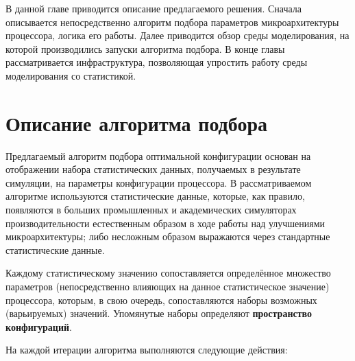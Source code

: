 В данной главе приводится описание предлагаемого решения. Сначала описывается непосредственно алгоритм подбора параметров микроархитектуры процессора, логика его работы. Далее приводится обзор среды моделирования, на которой производились запуски алгоритма подбора. В конце главы рассматривается инфраструктура, позволяющая упростить работу среды моделирования со статистикой.
\section{Описание алгоритма подбора}

Предлагаемый алгоритм подбора оптимальной конфигурации основан на отображении набора статистических данных, получаемых в результате симуляции, на параметры конфигурации процессора. В рассматриваемом алгоритме используются статистические данные, которые, как правило, появляются в больших промышленных и академических симуляторах производительности естественным образом в ходе работы над улучшениями микроархитектуры; либо несложным образом выражаются через стандартные статистические данные.

Каждому статистическому значению сопоставляется определённое множество параметров (непосредственно влияющих на данное статистическое значение) процессора, которым, в свою очередь, сопоставляются наборы возможных (варьируемых) значений. Упомянутые наборы определяют \textbf{пространство конфигураций}.

На каждой итерации алгоритма выполняются следующие действия:


